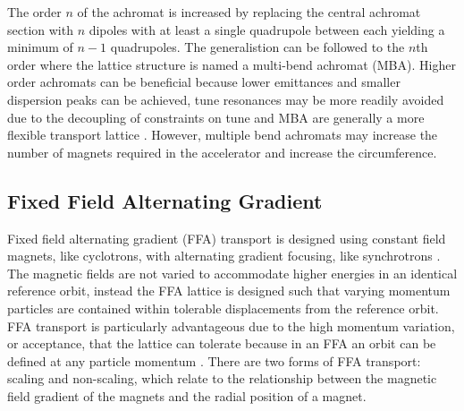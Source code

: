 \documentclass[../main.tex]{subfiles}
\begin{document}
The order $n$ of the achromat is increased by replacing the central achromat section with $n$ dipoles with at least a single quadrupole between each yielding a minimum of $n-1$ quadrupoles. The generalistion can be followed to the $n$th order where the lattice structure is named a multi-bend achromat (MBA). Higher order achromats can be beneficial because lower emittances and smaller dispersion peaks can be achieved, tune resonances may be more readily avoided due to the decoupling of constraints on tune and MBA are generally a more flexible transport lattice \cite{jackson1986comparison}. However, multiple bend achromats may increase the number of magnets required in the accelerator and increase the circumference.  

\subsection{Fixed Field Alternating Gradient}
\label{sec:FFA}

Fixed field alternating gradient (FFA) transport is designed using constant field magnets, like cyclotrons, with alternating gradient focusing, like synchrotrons \cite{machida2013fixed}. The magnetic fields are not varied to accommodate higher energies in an identical reference orbit, instead the FFA lattice is designed such that varying momentum particles are contained within tolerable displacements from the reference orbit. FFA transport is particularly advantageous due to the high momentum variation, or acceptance, that the lattice can tolerate because in an FFA an orbit can be defined at any particle momentum \cite{barlow2010emma}. There are two forms of FFA transport: scaling and non-scaling, which relate to the relationship between the magnetic field gradient of the magnets and the radial position of a magnet.
\end{document}
